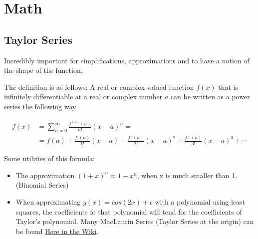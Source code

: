 

\section{Math}

\subsection{Taylor Series}
Incredibly important for simplifications, approximations and to have a notion of the shape of the function.

The definition is as follows:
A real or complex-valued function $f(x)$ that is infinitely differentiable at a real or complex number $a$ can be written as a power series the following way

\begin{align*}
    f(x) &= \sum_{n = 0}^{\infty} \frac{f^{(n)}(a)}{n!} (x-a)^n = \\
    &= f(a)+{\frac {f'(a)}{1!}}(x-a)+{\frac {f''(a)}{2!}}(x-a)^{2}+{\frac {f'''(a)}{3!}}(x-a)^{3}+\cdots
\end{align*}

Some utilities of this formula:
\begin{itemize}
    \item The approximation $(1+x)^n \approx 1-x^n$, when x is much smaller than 1. (Binomial Series)
    \item When approximating $y(x) = cos(2x) + \epsilon$ with a polynomial using least squares, the coefficients fo that polynomial will tend for the coefficients of Taylor's polynomial. Many MacLaurin Series (Taylor Series at the origin) can be found \href{https://en.wikipedia.org/wiki/Taylor_series#List_of_Maclaurin_series_of_some_common_functions}{\ul{Here in the Wiki}}.
\end{itemize}

